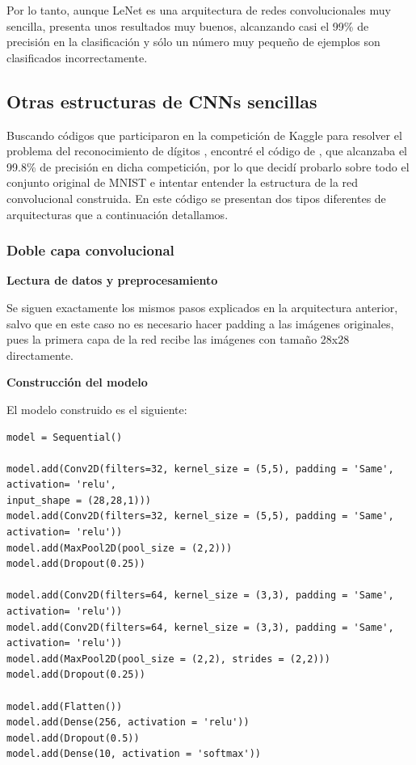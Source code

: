\documentclass[a4paper,11pt]{article}
\begin{document}
Por lo tanto, aunque LeNet es una arquitectura de redes convolucionales muy sencilla, presenta unos resultados muy buenos, alcanzando casi el 99\% de precisión en la clasificación y sólo un número muy pequeño de ejemplos son clasificados incorrectamente.
\subsection{Otras estructuras de CNNs sencillas}
\label{subsection:my}
Buscando códigos que participaron en la competición de Kaggle para resolver el problema del reconocimiento de dígitos \cite{13}, encontré el código de \cite{14}, que alcanzaba el 99.8\% de precisión en dicha competición, por lo que decidí probarlo sobre todo el conjunto original de MNIST e intentar entender la estructura de la red convolucional construida. En este código se presentan dos tipos diferentes de arquitecturas que a continuación detallamos.

\subsubsection{Doble capa convolucional}
\textbf{Lectura de datos y preprocesamiento}

Se siguen exactamente los mismos pasos explicados en la arquitectura anterior, salvo que en este caso no es necesario hacer padding a las imágenes originales, pues la primera capa de la red recibe las imágenes con tamaño 28x28 directamente.

\textbf{Construcción del modelo}

El modelo construido es el siguiente:
\begin{verbatim}
model = Sequential()

model.add(Conv2D(filters=32, kernel_size = (5,5), padding = 'Same', activation= 'relu',
input_shape = (28,28,1)))
model.add(Conv2D(filters=32, kernel_size = (5,5), padding = 'Same', activation= 'relu'))
model.add(MaxPool2D(pool_size = (2,2)))
model.add(Dropout(0.25))

model.add(Conv2D(filters=64, kernel_size = (3,3), padding = 'Same', activation= 'relu'))
model.add(Conv2D(filters=64, kernel_size = (3,3), padding = 'Same', activation= 'relu'))
model.add(MaxPool2D(pool_size = (2,2), strides = (2,2)))
model.add(Dropout(0.25))

model.add(Flatten())
model.add(Dense(256, activation = 'relu'))
model.add(Dropout(0.5))
model.add(Dense(10, activation = 'softmax'))
\end{verbatim}
\end{document}
